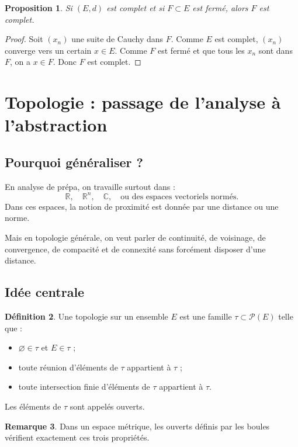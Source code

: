 \documentclass[11pt,a4paper]{article}
\theoremstyle{definition}
\newtheorem{definition}{Définition}[section]
\newtheorem{remarque}[definition]{Remarque}
\theoremstyle{plain}
\newtheorem{proposition}[definition]{Proposition}
\newcommand{\R}{\mathbb{R}}
\newcommand{\C}{\mathbb{C}}
\begin{document}
\begin{proposition}
Si $(E,d)$ est complet et si $F\subset E$ est fermé, alors $F$ est complet.
\end{proposition}

\begin{proof}
Soit $(x_n)$ une suite de Cauchy dans $F$.
Comme $E$ est complet, $(x_n)$ converge vers un certain $x\in E$.
Comme $F$ est fermé et que tous les $x_n$ sont dans $F$, on a $x\in F$.
Donc $F$ est complet.
\end{proof}

\section{Topologie : passage de l'analyse à l'abstraction}

\subsection{Pourquoi généraliser ?}

En analyse de prépa, on travaille surtout dans :
\[
\R,\quad \R^n,\quad \C,\quad \text{ou des espaces vectoriels normés}.
\]
Dans ces espaces, la notion de proximité est donnée par une distance ou une norme.

Mais en topologie générale, on veut parler de continuité, de voisinage, de convergence, de compacité et de connexité sans forcément disposer d'une distance.

\subsection{Idée centrale}

\begin{definition}
Une topologie sur un ensemble $E$ est une famille $\tau\subset \mathcal P(E)$ telle que :
\begin{itemize}
    \item $\varnothing\in\tau$ et $E\in\tau$ ;
    \item toute réunion d'éléments de $\tau$ appartient à $\tau$ ;
    \item toute intersection finie d'éléments de $\tau$ appartient à $\tau$.
\end{itemize}
Les éléments de $\tau$ sont appelés ouverts.
\end{definition}

\begin{remarque}
Dans un espace métrique, les ouverts définis par les boules vérifient exactement ces trois propriétés.
\end{remarque}
\end{document}
